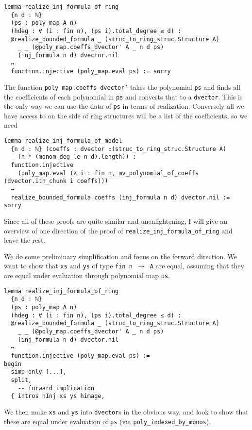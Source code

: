 \begin{lstlisting}
lemma realize_inj_formula_of_ring
  {n d : ℕ}
  (ps : poly_map A n)
  (hdeg : ∀ (i : fin n), (ps i).total_degree ≤ d) :
  @realize_bounded_formula _ (struc_to_ring_struc.Structure A)
    _ _ (@poly_map.coeffs_dvector' A _ n d ps)
    (inj_formula n d) dvector.nil
  ↔
  function.injective (poly_map.eval ps) := sorry \end{lstlisting}

The function \texttt{poly\_map.coeffs\_dvector'} takes the polynomial \texttt{ps}
and finds all the coefficients of each polynomial in \texttt{ps}
and converts that to a \texttt{dvector}.
This is the only way we can use the data of \texttt{ps} in terms of realization.
Conversely all we have access to on the side of ring structures
will be a list of the coefficients, so we need

\begin{lstlisting}
lemma realize_inj_formula_of_model
  {n d : ℕ} (coeffs : dvector ↥(struc_to_ring_struc.Structure A)
    (n * (monom_deg_le n d).length)) :
  function.injective
    (poly_map.eval (λ i : fin n, mv_polynomial_of_coeffs (dvector.ith_chunk i coeffs)))
  ↔
  realize_bounded_formula coeffs (inj_formula n d) dvector.nil := sorry
\end{lstlisting}

Since all of these proofs are quite similar and unenlightening,
I will give an overview of one direction of the proof of
\texttt{realize\_inj\_formula\_of\_ring} and leave the rest.

We do some preliminary simplification and focus on the forward direction.
We want to show that \texttt{xs} and \texttt{ys} of type \texttt{fin n $\to$ A} are equal,
assuming that they are equal under evaluation through polynomial map \texttt{ps}.

\begin{lstlisting}
lemma realize_inj_formula_of_ring
  {n d : ℕ}
  (ps : poly_map A n)
  (hdeg : ∀ (i : fin n), (ps i).total_degree ≤ d) :
  @realize_bounded_formula _ (struc_to_ring_struc.Structure A)
    _ _ (@poly_map.coeffs_dvector' A _ n d ps)
    (inj_formula n d) dvector.nil
  ↔
  function.injective (poly_map.eval ps) :=
begin
  simp only [...],
  split,
    -- forward implication
  { intros hInj xs ys himage, \end{lstlisting}

We then make \texttt{xs} and \texttt{ys} into \texttt{dvector}s
in the obvious way,
and look to show that these are equal under evaluation
of \texttt{ps} (via \texttt{poly\_indexed\_by\_monos}).


